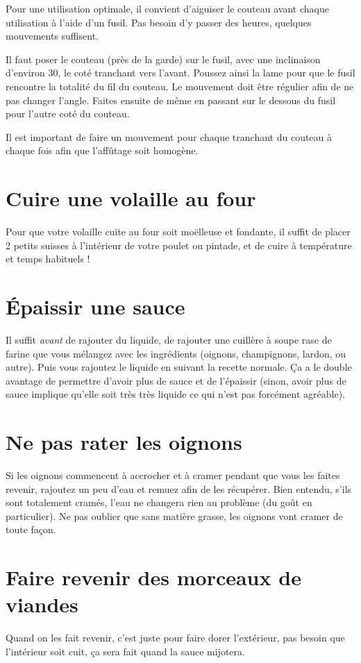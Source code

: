 \documentclass[a4paper,twoside]{report}
\begin{document}
\begin{remarque}
Pour une utilisation optimale, il convient d'aiguiser le couteau avant chaque utilisation à l'aide d'un fusil. Pas besoin d'y passer des heures, quelques mouvements suffisent.

Il faut poser le couteau (près de la garde) sur le fusil, avec une inclinaison d'environ 30\degre, le coté tranchant vers l'avant. Poussez ainsi la lame pour que le fusil rencontre la totalité du fil du couteau. Le mouvement doit être régulier afin de ne pas changer l'angle. Faites ensuite de même en passant sur le dessous du fusil pour l'autre coté du couteau.

Il est important de faire un mouvement pour chaque tranchant du couteau à chaque fois afin que l'affûtage soit homogène.
\end{remarque}


\section{Cuire une volaille au four}
Pour que votre volaille cuite au four soit moëlleuse et fondante, il suffit de placer 2 petits suisses à l'intérieur de votre poulet ou pintade, et de cuire à température et temps habituels !

\section{Épaissir une sauce}
Il suffit \emph{avant} de rajouter du liquide, de rajouter une cuillère à soupe rase de farine que vous mélangez avec les ingrédients (oignons, champignons, lardon, ou autre). Puis vous rajoutez le liquide en suivant la recette normale. Ça a le double avantage de permettre d'avoir plus de sauce et de l'épaissir (sinon, avoir plus de sauce implique qu'elle soit très très liquide ce qui n'est pas forcément agréable).


\section{Ne pas rater les oignons}
Si les oignons commencent à accrocher et à cramer pendant que vous les faites revenir, rajoutez un peu d'eau et remuez afin de les récupérer. Bien entendu, s'ils sont totalement cramés, l'eau ne changera rien au problème (du goût en particulier). Ne pas oublier que sans matière grasse, les oignons vont cramer de toute façon.

\section{Faire revenir des morceaux de viandes}
Quand on les fait revenir, c'est juste pour faire dorer l'extérieur, pas besoin que l'intérieur soit cuit, ça sera fait quand la sauce mijotera.
\end{document}
